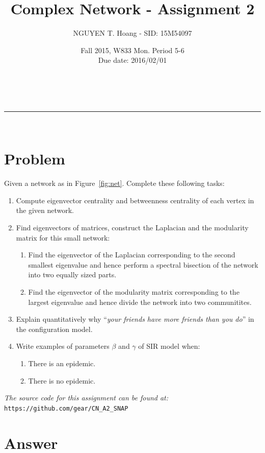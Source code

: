 \documentclass[a4paper,12pt]{article}
\makeatletter
\newcommand{\linia}{\rule{\linewidth}{0.5pt}}
\renewcommand{\maketitle} {%
\begin{center}
\vspace{2ex}
{\huge \textsc{\@title}}
\vspace{1ex}
\\
\linia\\
\@author \hfill \@date
\vspace{4ex}
\end{center}
}
\makeatother
\begin{document}

\title{Complex Network - Assignment 2}

\author{NGUYEN T. Hoang - SID: 15M54097}

\date{Fall 2015, W833 Mon. Period 5-6 \\ \hfill Due date: 2016/02/01}

\maketitle

\vspace{2em}
\section*{Problem}
\noindent
Given a network as in Figure~\ref{fig:net}. Complete these following tasks:
\begin{enumerate}
    \item Compute eigenvector centrality and betweenness centrality of each vertex in the given network.
    \item Find eigenvectors of matrices, construct the Laplacian and the modularity matrix for this small network:
    \begin{enumerate}
        \item Find the eigenvector of the Laplacian corresponding to the second smallest eigenvalue and hence perform a spectral bisection of the network into two equally sized parts.
        \item Find the eigenvector of the modularity matrix corresponding to the largest eigenvalue and hence divide the network into two communitites.
    \end{enumerate}
    \item Explain quantitatively why ``\emph{your friends have more friends than you do}'' in the configuration model.
    \item Write examples of parameters $\beta$ and $\gamma$ of SIR model when:
    \begin{enumerate}
        \item There is an epidemic.
        \item There is no epidemic.
    \end{enumerate}
\end{enumerate}
\vspace{1.5em}
\noindent
\emph{The source code for this assignment can be found at:} \\
\texttt{https://github.com/gear/CN\_A2\_SNAP}
\pagebreak
\section*{Answer}
\end{document}
